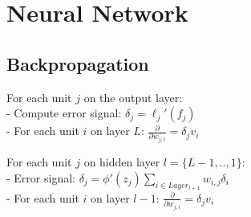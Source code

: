 \section{Neural Network}
\subsection*{Backpropagation}
For each unit $j$ on the output layer:\\
- Compute error signal: $\delta_j = \ell_j'(f_j)$\\
- For each unit $i$ on layer $L$: $\frac{\partial}{\partial w_{j,i}} = \delta_j v_i$

For each unit $j$ on hidden layer $l=\{L-1,..,1\}$:\\
- Error signal: $\delta_j = \phi'(z_j) \sum_{i\in Layer_{l+1}} w_{i,j}\delta_i$\\
- For each unit $i$ on layer $l-1$: $\frac{\partial}{\partial w_{j,i}} = \delta_j v_i$
